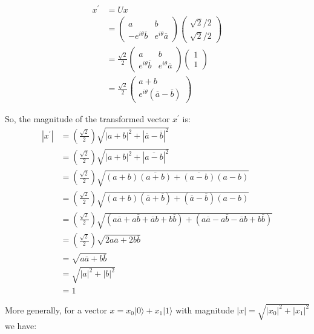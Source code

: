 \documentclass{article}
\begin{document}
\begin{align*}
x^{\prime} &= U x\\
&=
\begin{pmatrix}
a & b\\
-e^{i\theta}\overline{b} & e^{i\theta}\overline{a}
\end{pmatrix}
\begin{pmatrix}
\sqrt{2}/2\\
\sqrt{2}/2
\end{pmatrix}\\
&= \frac{\sqrt{2}}{2}
\begin{pmatrix}
a & b\\
e^{i\theta}\overline{b} & e^{i\theta}\overline{a}
\end{pmatrix}
\begin{pmatrix}
1\\
1
\end{pmatrix}\\
&= \frac{\sqrt{2}}{2}
\begin{pmatrix}
   a + b\\
   e^{i\theta}(\overline{a} - \overline{b})
   \end{pmatrix}
\end{align*}

So, the magnitude of the transformed vector $x^{\prime}$ is:
\begin{align*}
|x^{\prime}| &= (\frac{\sqrt{2}}{2})\sqrt{|a+b|^2 + |\overline{a}-\overline{b}|^2}\\
&= (\frac{\sqrt{2}}{2})\sqrt{|a+b|^2 + |\overline{a - b}|^2}\\
&= (\frac{\sqrt{2}}{2})\sqrt{
  (a+b)\overline{(a+b)} + 
  \overline{(a - b)}(a - b)}\\
&= (\frac{\sqrt{2}}{2})\sqrt{
  (a+b)(\overline{a}+\overline{b}) + 
  (\overline{a} - \overline{b})(a - b)}\\
&= (\frac{\sqrt{2}}{2})\sqrt{
  (a\overline{a} + a\overline{b} + \overline{a}b + b\overline{b}) + 
  (a\overline{a} - a\overline{b} - \overline{a}b + b\overline{b})
  }\\
&= (\frac{\sqrt{2}}{2})\sqrt{
  2 a \overline{a} + 2 b \overline{b}
  }\\
&= \sqrt{
  a \overline{a} + b \overline{b}
  }\\
&= \sqrt{
  |a|^2 + |b|^2
  }\\
&= 1
\end{align*}

More generally, for a vector $x = x_0 |0\rangle + x_1 |1\rangle$ with magnitude $|x| = \sqrt{|x_0|^2 + |x_1|^2}$ we have:
\end{document}

